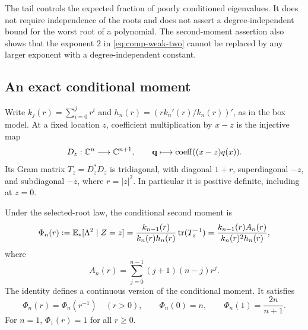 The tail controls the expected fraction of poorly conditioned
eigenvalues.  It does not require independence of the roots and does not
assert a degree-independent bound for the worst root of a polynomial.
The second-moment assertion also shows that the exponent $2$ in
\eqref{eq:comp-weak-two} cannot be replaced by any larger exponent with
a degree-independent constant.

\subsection{An exact conditional moment}

Write $k_j(r)=\sum_{i=0}^{j}r^i$ and
$h_n(r)=(r k_n'(r)/k_n(r))'$, as in the box model.  At a fixed location
$z$, coefficient multiplication by $x-z$ is the injective map
\[
  D_z:\mathbb C^n\longrightarrow\mathbb C^{n+1},
  \qquad \mathbf q\longmapsto\operatorname{coeff}((x-z)q(x)).
\]
Its Gram matrix $T_z=D_z^*D_z$ is tridiagonal, with diagonal $1+r$,
superdiagonal $-z$, and subdiagonal $-\overline z$, where $r=|z|^2$.
In particular it is positive definite, including at $z=0$.

\begin{proposition}\label{prop:comp-exact}
Under the selected-root law, the conditional second moment is
\begin{equation}\label{eq:comp-exact}
  \Phi_n(r):=\mathbb E_*[\Lambda^2\mid Z=z]
  =\frac{k_{n-1}(r)}{k_n(r)h_n(r)}\operatorname{tr}(T_z^{-1})
  =\frac{k_{n-1}(r)A_n(r)}{k_n(r)^2h_n(r)},
\end{equation}
where
\begin{equation}\label{eq:comp-trace-poly}
  A_n(r)=\sum_{j=0}^{n-1}(j+1)(n-j)r^j.
\end{equation}
The identity defines a continuous version of the conditional moment.
It satisfies
\[
  \Phi_n(r)=\Phi_n(r^{-1})\quad(r>0),
  \qquad \Phi_n(0)=n,
  \qquad \Phi_n(1)=\frac{2n}{n+1}.
\]
For $n=1$, $\Phi_1(r)=1$ for all $r\ge0$.
\end{proposition}

